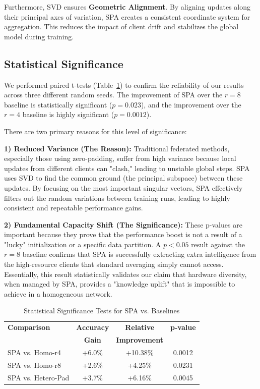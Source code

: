 \documentclass[conference]{IEEEtran}
\begin{document}
Furthermore, SVD ensures \textbf{Geometric Alignment}. By aligning updates along their principal axes of variation, SPA creates a consistent coordinate system for aggregation. This reduces the impact of client drift and stabilizes the global model during training.

\subsection{Statistical Significance}

We performed paired t-tests (Table~\ref{tab:significance}) to confirm the reliability of our results across three different random seeds. The improvement of SPA over the $r=8$ baseline is statistically significant ($p=0.023$), and the improvement over the $r=4$ baseline is highly significant ($p=0.0012$).

There are two primary reasons for this level of significance:

\textbf{1) Reduced Variance (The Reason):} Traditional federated methods, especially those using zero-padding, suffer from high variance because local updates from different clients can "clash," leading to unstable global steps. SPA uses SVD to find the common ground (the principal subspace) between these updates. By focusing on the most important singular vectors, SPA effectively filters out the random variations between training runs, leading to highly consistent and repeatable performance gains.

\textbf{2) Fundamental Capacity Shift (The Significance):} These p-values are important because they prove that the performance boost is not a result of a "lucky" initialization or a specific data partition. A $p < 0.05$ result against the $r=8$ baseline confirms that SPA is successfully extracting extra intelligence from the high-resource clients that standard averaging simply cannot access. Essentially, this result statistically validates our claim that hardware diversity, when managed by SPA, provides a "knowledge uplift" that is impossible to achieve in a homogeneous network.

\begin{table}[t]
\centering
\caption{Statistical Significance Tests for SPA vs. Baselines}
\label{tab:significance}
\begin{tabular}{lccc}
\toprule
\textbf{Comparison} & \textbf{Accuracy} & \textbf{Relative} & \textbf{p-value} \\
 & \textbf{Gain} & \textbf{Improvement} & \\
\midrule
SPA vs. Homo-r4 & +6.0\% & +10.38\% & 0.0012 \\
SPA vs. Homo-r8 & +2.6\% & +4.25\% & 0.0231 \\
SPA vs. Hetero-Pad & +3.7\% & +6.16\% & 0.0045 \\
\bottomrule
\end{tabular}
\end{table}
\end{document}

